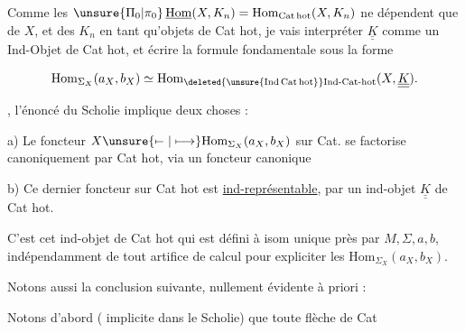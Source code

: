  Comme les $\unsure{\Pi_0|\pi_0}\,\underline{\mathrm{Hom}}(X,K_n)=\mathrm{Hom}_{\mathrm{Cat\,hot}}(X,K_n)$ ne dépendent que de $X$, et des $K_n$ en tant qu'objets de Cat hot,  je vais interpréter $\underline{\underline K}$ comme un Ind-Objet de Cat hot, et écrire la formule fondamentale sous la forme

\[
\mathrm{Hom}_{\Sigma_X}(a_X,b_X)\simeq
 \mathrm{Hom}_{\deleted{\unsure{\mathrm{Ind\,Cat\,hot}}}\mathrm{Ind\text{-}Cat\text{-}hot}}(X,\underline{\underline K}).
\]

, l'énoncé du Scholie implique deux choses :

a) Le  foncteur $X\unsure{\mapstochar\relbar|\longmapsto}\mathrm{Hom}_{\Sigma_X}(a_X,b_X)$ sur Cat. se factorise canoniquement par Cat hot, via un foncteur canonique


b) Ce dernier  foncteur  sur Cat hot est \uline{ind-représentable}, par un ind-objet $\underline{\underline K}$ de Cat hot.

C'est cet ind-objet de Cat hot qui est défini à isom unique près par $M,\Sigma,a,b$, indépendamment de tout artifice de calcul pour expliciter les $\mathrm{Hom}_{\Sigma_X}(a_X,b_X)$.

Notons  aussi la conclusion suivante, nullement évidente à priori :



Notons d'abord  ( implicite dans le Scholie) que toute flèche de Cat


